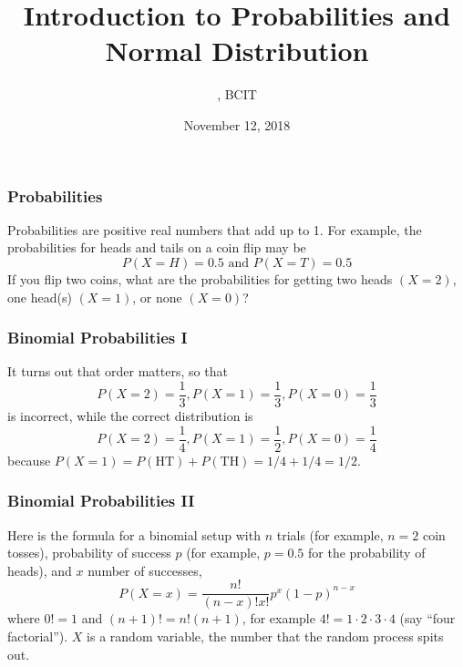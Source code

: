 \documentclass[xcolor=dvipsnames]{beamer}
\title{Introduction to Probabilities and Normal Distribution}
\subtitle{{\CourseNumber}, BCIT}
\author{\CourseName}
\date{November 12, 2018}
\begin{document}
\begin{frame}
  \titlepage
\end{frame}

\begin{frame}
  \frametitle{Probabilities}
\alert{Probabilities} are positive real numbers that add up to 1. For example,
the probabilities for heads and tails on a coin flip may be
\begin{equation}
  \label{eq:veejooni}
  P(X=H)=0.5\mbox{ and }P(X=T)=0.5
\end{equation}
If you flip two coins, what are the probabilities for getting two
heads $(X=2)$, one head(s) $(X=1)$, or none $(X=0)$?
\end{frame}

\begin{frame}
  \frametitle{Binomial Probabilities I}
It turns out that order matters, so that
\begin{equation}
  \label{eq:eijietha}
  P(X=2)=\frac{1}{3},P(X=1)=\frac{1}{3},P(X=0)=\frac{1}{3}
\end{equation}
is incorrect, while the correct distribution is
\begin{equation}
  \label{eq:eepuneeb}
  P(X=2)=\frac{1}{4},P(X=1)=\frac{1}{2},P(X=0)=\frac{1}{4}
\end{equation}
because $P(X=1)=P(\mbox{HT})+P(\mbox{TH})=1/4+1/4=1/2$.
\end{frame}

\begin{frame}
  \frametitle{Binomial Probabilities II}
Here is the formula for a \alert{binomial} setup with $n$ trials (for example,
$n=2$ coin tosses), probability of success $p$ (for example, $p=0.5$ for the
probability of heads), and $x$ number of successes,
\begin{equation}
  \label{eq:uedaikie}
  P(X=x)=\frac{n!}{(n-x)!x!}p^{x}(1-p)^{n-x}
\end{equation}
where $0!=1$ and $(n+1)!=n!(n+1)$, for example
$4!=1\cdot{}2\cdot{}3\cdot{}4$ (say ``four factorial''). $X$ is a
\alert{random variable}, the number that the random process spits out.
\end{frame}
\end{document}
